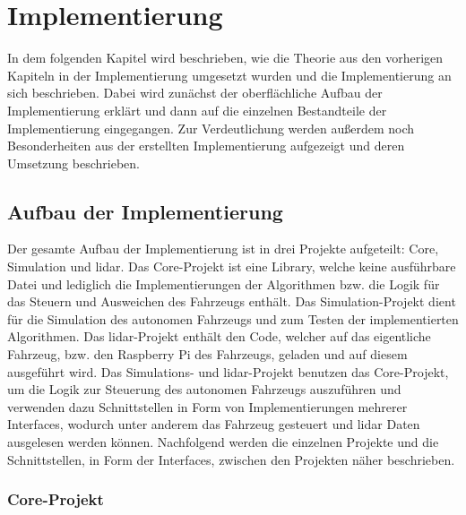 \section{Implementierung}

In dem folgenden Kapitel wird beschrieben, wie die Theorie aus den vorherigen Kapiteln in der Implementierung umgesetzt wurden 
und die Implementierung an sich beschrieben. 
Dabei wird zunächst der oberflächliche Aufbau der Implementierung erklärt und dann auf die einzelnen Bestandteile der Implementierung eingegangen. 
Zur Verdeutlichung werden außerdem noch Besonderheiten aus der erstellten Implementierung aufgezeigt und deren Umsetzung beschrieben. 

\subsection{Aufbau der Implementierung}

Der gesamte Aufbau der Implementierung ist in drei Projekte aufgeteilt: Core, Simulation und \ac{lidar}. 
Das Core-Projekt ist eine Library, welche keine ausführbare Datei und lediglich die Implementierungen der Algorithmen bzw. die Logik 
für das Steuern und Ausweichen des Fahrzeugs enthält. 
Das Simulation-Projekt dient für die Simulation des autonomen Fahrzeugs und zum Testen der implementierten Algorithmen. 
Das \ac{lidar}-Projekt enthält den Code, welcher auf das eigentliche Fahrzeug, 
bzw. den Raspberry Pi des Fahrzeugs, geladen und auf diesem ausgeführt wird. 
Das Simulations- und \ac{lidar}-Projekt benutzen das Core-Projekt, um die Logik zur Steuerung des autonomen Fahrzeugs auszuführen und 
verwenden dazu Schnittstellen in Form von Implementierungen mehrerer Interfaces, 
wodurch unter anderem das Fahrzeug gesteuert und \ac{lidar} Daten ausgelesen werden können. 
Nachfolgend werden die einzelnen Projekte und die Schnittstellen, in Form der Interfaces, zwischen den Projekten näher beschrieben. 

\subsubsection{Core-Projekt}

